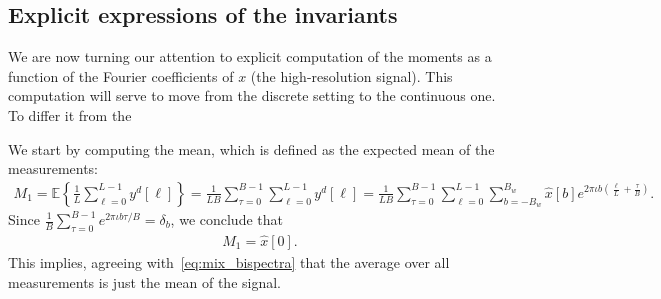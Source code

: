 \documentclass[english,12pt]{article}
\newcommand{\I}{\iota}
\newcommand{\tB}{B_w}
\newcommand{\hx}{\hat{x}}
\newcommand{\E}{\mathbb{E}}
\numberwithin{equation}{section}
\numberwithin{thm}{section} %
\begin{document}
\subsection{Explicit expressions of the invariants} \label{sec:expressions}

We are now turning our attention to explicit computation of the moments as a function of the Fourier coefficients of $x$ (the high-resolution signal). This computation will serve to move from the discrete setting to the continuous one. To differ it from the  

We start by computing the mean, which is defined as the expected mean of the measurements: 
\begin{equation}
\begin{split}
M_1 = \E\left\{ \frac{1}{L} \sum_{\ell=0}^{L-1} y^d[\ell]\right\} =  \frac{1}{LB}\sum_{\tau=0}^{B-1}\sum_{\ell=0}^{L-1} y^d[\ell] =  \frac{1}{LB}\sum_{\tau=0}^{B-1}\sum_{\ell=0}^{L-1}
\sum_{b=-\tB}^{\tB}\hat{x}[b]e^{2\pi\I b \left(\frac{\ell}{L} + \frac{\tau}{B}\right) }.
\end{split}
\end{equation}
Since $\frac{1}{B}\sum_{\tau=0}^{B-1}e^{2\pi\I b \tau/B}=\delta_b$, we conclude that 
\begin{equation} \label{eq:mean}
\begin{split}
M_1 = \hx[0].
\end{split}
\end{equation}
This  implies, agreeing with~\eqref{eq:mix_bispectra} that the average over all measurements is just the mean of the signal.  
\end{document}
